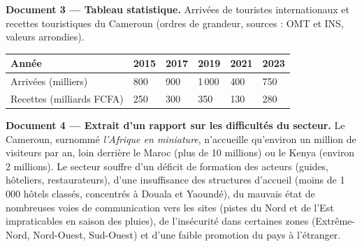 \documentclass[11pt]{article}
\newcounter{popsec}
\newcounter{popsub}
\newcommand{\courssub}[1]{%
  \stepcounter{popsub}%
  \par\vspace{9pt}\noindent{\popxbold\fontsize{11.5}{13}\selectfont\color{popink}{\color{poporange}\thepopsec.\thepopsub}\hspace{6pt}#1}\par\nopagebreak\vspace{4pt}
}
\begin{document}
\textbf{Document 3 — Tableau statistique.} Arrivées de touristes internationaux et recettes touristiques du Cameroun (ordres de grandeur, sources : OMT et INS, valeurs arrondies).

\begin{center}
\begin{tabularx}{\linewidth}{|l|X|X|X|X|X|}
\hline
\rowcolor{popblueL} \textbf{Année} & \textbf{2015} & \textbf{2017} & \textbf{2019} & \textbf{2021} & \textbf{2023} \\
\hline Arrivées (milliers) & 800 & 900 & 1\,000 & 400 & 750 \\
\hline Recettes (milliards FCFA) & 250 & 300 & 350 & 130 & 280 \\
\hline
\end{tabularx}
\end{center}

\textbf{Document 4 — Extrait d'un rapport sur les difficultés du secteur.} \og Le Cameroun, surnommé \emph{l'Afrique en miniature}, n'accueille qu'environ un million de visiteurs par an, loin derrière le Maroc (plus de 10 millions) ou le Kenya (environ 2 millions). Le secteur souffre d'un déficit de formation des acteurs (guides, hôteliers, restaurateurs), d'une insuffisance des structures d'accueil (moins de 1 000 hôtels classés, concentrés à Douala et Yaoundé), du mauvais état de nombreuses voies de communication vers les sites (pistes du Nord et de l'Est impraticables en saison des pluies), de l'insécurité dans certaines zones (Extrême-Nord, Nord-Ouest, Sud-Ouest) et d'une faible promotion du pays à l'étranger. \fg{}

\courssub{Consignes}
\end{document}

